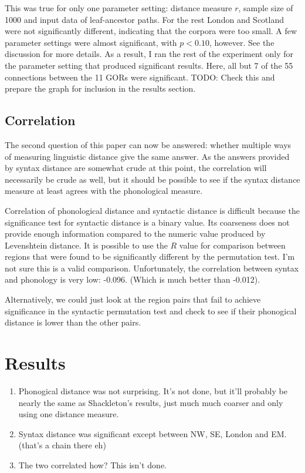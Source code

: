 \documentclass[11pt]{article}
\begin{document}
This was true for only one parameter setting: distance measure $r$,
sample size of 1000 and input data of leaf-ancestor paths. For the
rest London and Scotland were not significantly different, indicating
that the corpora were too small. A few parameter settings were almost
significant, with $p < 0.10$, however. See the discussion for more details.
As a result, I ran the rest of the experiment only for the parameter
setting that produced significant results. Here, all but 7 of the 55
connections between the 11 GORs were significant.
TODO: Check this and prepare the graph for inclusion in the results
section.

\subsection{Correlation}
The second question of this paper can now be answered: whether
multiple ways of measuring linguistic distance give the same
answer. As the answers provided by syntax distance are somewhat crude
at this point, the correlation will necessarily be crude as well, but
it should be possible to see if the syntax distance measure at least
agrees with the phonological measure.

Correlation of phonological distance and syntactic distance is
difficult because the significance test for syntactic distance is a
binary value. Its coarseness does not provide enough information
compared to the numeric value produced by Levenshtein distance.
It is possible to use the $R$ value for comparison between regions
that were found to be significantly different by the permutation
test. I'm not sure this is a valid comparison.
Unfortunately, the correlation between syntax and phonology is
very low: -0.096. (Which is much better than -0.012).

Alternatively, we could just look at the region pairs that fail to
achieve significance in the syntactic permutation test and check to
see if their phonogical distance is lower than the other pairs.

\section{Results}
\begin{enumerate}
\item Phonogical distance was not surprising. It's not done, but it'll
  probably be nearly the same as Shackleton's results, just much much
  coarser and only using one distance measure.
\item Syntax distance was significant except between NW, SE,
  London and EM. (that's a chain there eh)
\item The two correlated how? This isn't done.
\end{enumerate}
\end{document}
